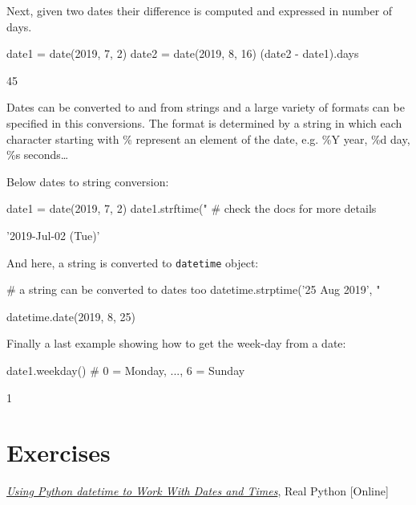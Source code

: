 Next, given two dates their difference is computed and expressed in number of days.

\begin{ipython}
date1 = date(2019, 7, 2)
date2 = date(2019, 8, 16)
(date2 - date1).days
\end{ipython}
\begin{ioutput}
45
\end{ioutput}

Dates can be converted to and from strings and a large variety of formats can be specified in this conversions. 
The format is determined by a string in which each character starting with \% represent an element 
of the date, e.g. \%Y year, \%d day, \%s seconds\ldots

Below dates to string conversion:

\begin{ipython}
date1 = date(2019, 7, 2)
date1.strftime("%
                                # check the docs for more details
\end{ipython}
\begin{ioutput}
'2019-Jul-02 (Tue)'
\end{ioutput}

And here, a string is converted to \texttt{datetime} object:

\begin{ipython}
# a string can be converted to dates too
datetime.strptime('25 Aug 2019', "%
\end{ipython}
\begin{ioutput}
datetime.date(2019, 8, 25)
\end{ioutput}

Finally a last example showing how to get the week-day from a date:

\begin{ipython}
date1.weekday() # 0 = Monday, ..., 6 = Sunday
\end{ipython}
\begin{ioutput}
1
\end{ioutput}

\section*{Exercises}


\begin{thebibliography}{9}
 \href{https://realpython.com/python-datetime/}{\emph{Using Python datetime to Work With Dates and Times}}, Real Python [Online]
\end{thebibliography}